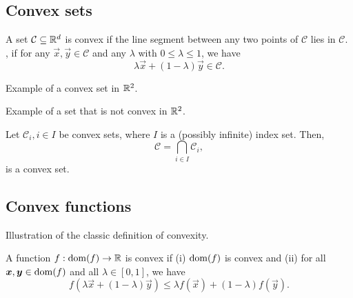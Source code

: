 \subsection{Convex sets}

\begin{definition}
    A set $\mathcal{C}\subseteq \mathbb{R}^d$ is convex if the line segment between any two points of
    $\mathcal{C}$ lies in $\mathcal{C}$. \Ie, if for any $\vec{x},\vec{y}\in \mathcal{C}$ and any
    $\lambda$ with $0\leq \lambda \leq 1$, we have \[
        \lambda \vec{x} + (1-\lambda)\vec{y} \in \mathcal{C}.
    \]
\end{definition}

\begin{marginfigure}
    \centering
    \caption{Example of a convex set in $\mathbb{R}^2$.}
    \label{fig:convex-set-example}
\end{marginfigure}

\begin{marginfigure}
    \centering
    \caption{Example of a set that is not convex in $\mathbb{R}^2$.}
    \label{fig:non-convex-set-example}
\end{marginfigure}

\begin{observation}
    Let $\mathcal{C}_i, i\in I$ be convex sets, where $I$ is a (possibly infinite) index set. Then, \[
        \mathcal{C} = \bigcap_{i\in I} \mathcal{C}_i,
    \]
    is a convex set.
\end{observation}

\subsection{Convex functions}

\begin{marginfigure}
    \centering
    \caption{Illustration of the classic definition of convexity.}
    \label{fig:convexity}
\end{marginfigure}

\begin{definition}[Convexity]
    A function $f: \mathrm{dom}(f) \to \mathbb{R}$ is convex if (i) $\mathrm{dom}(f)$ is convex and (ii) for all
    $\bm{x},\bm{y}\in\mathrm{dom}(f)$ and all $\lambda\in[0,1]$, we have \[
        f(\lambda \vec{x} + (1-\lambda) \vec{y}) \leq \lambda f(\vec{x}) + (1-\lambda) f(\vec{y}).
    \]
\end{definition}

